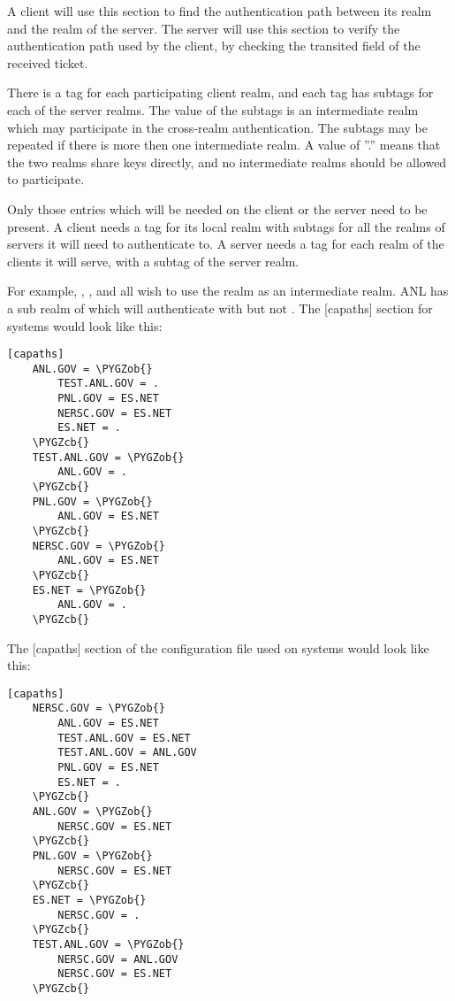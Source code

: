 \documentclass[letterpaper,10pt,english]{sphinxmanual}
\def\PYGZob{\char`\{}
\def\PYGZcb{\char`\}}
\begin{document}
A client will use this section to find the authentication path between
its realm and the realm of the server.  The server will use this
section to verify the authentication path used by the client, by
checking the transited field of the received ticket.

There is a tag for each participating client realm, and each tag has
subtags for each of the server realms.  The value of the subtags is an
intermediate realm which may participate in the cross-realm
authentication.  The subtags may be repeated if there is more then one
intermediate realm.  A value of ''.'' means that the two realms share
keys directly, and no intermediate realms should be allowed to
participate.

Only those entries which will be needed on the client or the server
need to be present.  A client needs a tag for its local realm with
subtags for all the realms of servers it will need to authenticate to.
A server needs a tag for each realm of the clients it will serve, with
a subtag of the server realm.

For example, , , and  all wish to
use the  realm as an intermediate realm.  ANL has a sub
realm of  which will authenticate with 
but not .  The {[}capaths{]} section for  systems
would look like this:

\begin{Verbatim}[commandchars=\\\{\}]
[capaths]
    ANL.GOV = \PYGZob{}
        TEST.ANL.GOV = .
        PNL.GOV = ES.NET
        NERSC.GOV = ES.NET
        ES.NET = .
    \PYGZcb{}
    TEST.ANL.GOV = \PYGZob{}
        ANL.GOV = .
    \PYGZcb{}
    PNL.GOV = \PYGZob{}
        ANL.GOV = ES.NET
    \PYGZcb{}
    NERSC.GOV = \PYGZob{}
        ANL.GOV = ES.NET
    \PYGZcb{}
    ES.NET = \PYGZob{}
        ANL.GOV = .
    \PYGZcb{}
\end{Verbatim}

The {[}capaths{]} section of the configuration file used on 
systems would look like this:

\begin{Verbatim}[commandchars=\\\{\}]
[capaths]
    NERSC.GOV = \PYGZob{}
        ANL.GOV = ES.NET
        TEST.ANL.GOV = ES.NET
        TEST.ANL.GOV = ANL.GOV
        PNL.GOV = ES.NET
        ES.NET = .
    \PYGZcb{}
    ANL.GOV = \PYGZob{}
        NERSC.GOV = ES.NET
    \PYGZcb{}
    PNL.GOV = \PYGZob{}
        NERSC.GOV = ES.NET
    \PYGZcb{}
    ES.NET = \PYGZob{}
        NERSC.GOV = .
    \PYGZcb{}
    TEST.ANL.GOV = \PYGZob{}
        NERSC.GOV = ANL.GOV
        NERSC.GOV = ES.NET
    \PYGZcb{}
\end{Verbatim}
\end{document}
